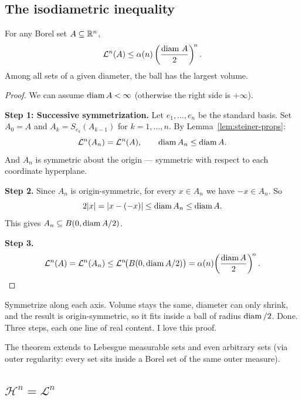 \subsection{The isodiametric inequality}\label{subsec:isodiametric}

\begin{theorem}\label{thm:isodiametric}
For any Borel set $A \subseteq \mathbb{R}^n$,
\[
  \mathcal{L}^n(A) \le \alpha(n)
    \left(\frac{\operatorname{diam}\, A}{2}\right)^{\!n}.
\]
Among all sets of a given diameter, the ball has the largest volume.
\end{theorem}

\begin{proof}
We can assume $\operatorname{diam} A < \infty$ (otherwise the right side is $+\infty$).

\textbf{Step 1: Successive symmetrization.} Let $e_1, \ldots, e_n$ be the
standard basis. Set $A_0 = A$ and $A_k = S_{e_k}(A_{k-1})$ for
$k = 1, \ldots, n$. By Lemma~\ref{lem:steiner-props}:
\[
  \mathcal{L}^n(A_n) = \mathcal{L}^n(A), \qquad
  \operatorname{diam} A_n \le \operatorname{diam} A.
\]
And $A_n$ is symmetric about the origin --- symmetric with respect to each
coordinate hyperplane.

\textbf{Step 2.} Since $A_n$ is origin-symmetric, for every $x \in A_n$
we have $-x \in A_n$. So
\[
  2|x| = |x - (-x)| \le \operatorname{diam} A_n \le \operatorname{diam} A.
\]
This gives $A_n \subseteq B(0, \operatorname{diam} A/2)$.

\textbf{Step 3.}
\[
  \mathcal{L}^n(A) = \mathcal{L}^n(A_n)
  \le \mathcal{L}^n\!\bigl(B(0, \operatorname{diam} A/2)\bigr)
  = \alpha(n)\!\left(\frac{\operatorname{diam} A}{2}\right)^{\!n}. \qedhere
\]
\end{proof}

Symmetrize along each axis. Volume stays the same, diameter can only shrink, and the result is origin-symmetric, so it fits inside a ball of radius $\operatorname{diam}/2$. Done. Three steps, each one line of real content. I love this proof.

\begin{remark}\label{rem:isodiametric-extends}
The theorem extends to Lebesgue measurable sets and even arbitrary sets
(via outer regularity: every set sits inside a Borel set of the same
outer measure).
\end{remark}


\subsection{$\mathcal{H}^n = \mathcal{L}^n$}\label{subsec:Hn-Ln}

